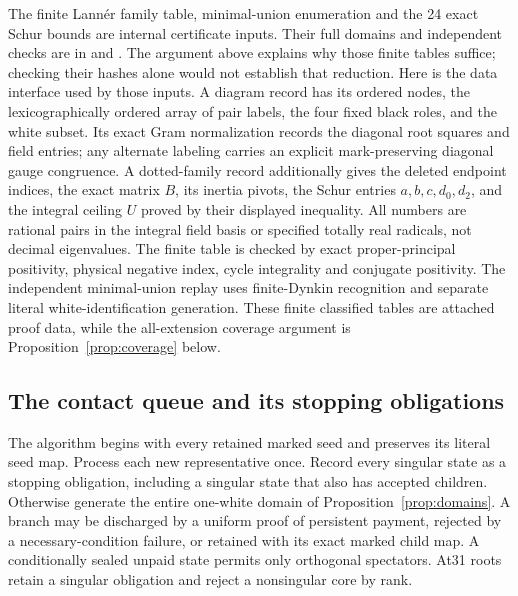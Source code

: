 \documentclass[11pt]{article}
\begin{document}
The finite Lann\'er family table, minimal-union enumeration and the
24 exact Schur bounds are internal certificate inputs. Their full
domains and independent checks are in
 and
.
The argument above explains why those finite tables suffice; checking
their hashes alone would not establish that reduction.
Here is the data interface used by those inputs. A diagram record has
its ordered nodes, the lexicographically ordered array of pair labels,
the four fixed black roles, and the white subset. Its exact Gram
normalization records the diagonal root squares and field entries;
any alternate labeling carries an explicit mark-preserving diagonal
gauge congruence. A dotted-family record additionally gives the deleted
endpoint indices, the exact matrix $B$, its inertia pivots, the Schur
entries $a,b,c,d_0,d_2$, and the integral ceiling $U$ proved by their
displayed inequality. All numbers are rational pairs in the integral
field basis or specified totally real radicals, not decimal eigenvalues.
The finite table is checked by exact proper-principal positivity,
physical negative index, cycle integrality and conjugate positivity.
The independent minimal-union replay uses finite-Dynkin recognition
and separate literal white-identification generation. These finite
classified tables are attached proof data, while the all-extension
coverage argument is Proposition~\ref{prop:coverage} below.

\subsection{The contact queue and its stopping obligations}

The algorithm begins with every retained marked seed and preserves
its literal seed map. Process each new representative once. Record
every singular state as a stopping obligation, including a singular
state that also has accepted children. Otherwise generate the entire
one-white domain of Proposition~\ref{prop:domains}. A branch may be
discharged by a uniform proof of persistent payment, rejected by a
necessary-condition failure, or retained with its exact marked child
map. A conditionally sealed unpaid state permits only orthogonal
spectators. At31 roots retain a singular obligation and reject a
nonsingular core by rank.
\end{document}
